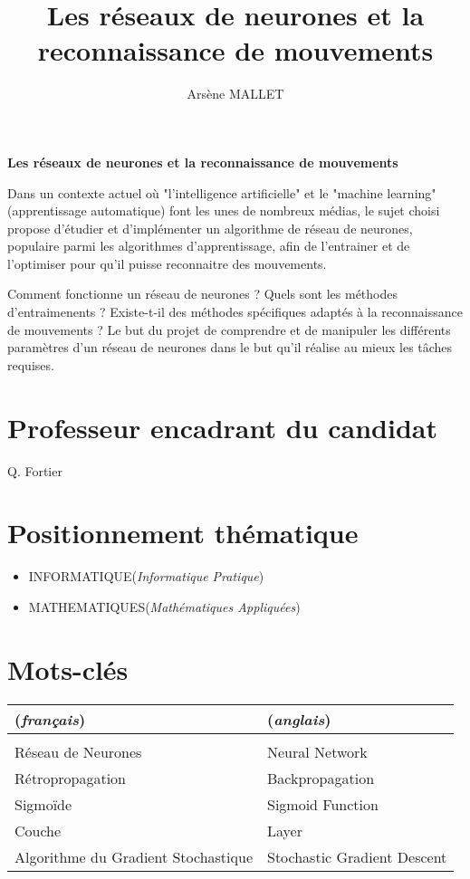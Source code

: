 \documentclass[a4paper, 11pt]{article}
\author{Arsène MALLET}
\title{Les réseaux de neurones et la reconnaissance de mouvements}
\begin{document}
    
\begin{center}
    {\textbf {\LARGE Les réseaux de neurones et la reconnaissance de mouvements}}
\end{center}

\vspace{5mm}

Dans un contexte actuel où "l'intelligence artificielle" et le "machine learning"
(apprentissage automatique) font les unes de nombreux médias, le sujet choisi
propose d'étudier et d'implémenter un algorithme de réseau de neurones, populaire
parmi les algorithmes d'apprentissage, afin de l'entrainer et de l'optimiser pour qu'il
puisse reconnaitre des mouvements.

Comment fonctionne un réseau de neurones ? Quels sont les méthodes d'entraimenents ?
Existe-t-il des méthodes spécifiques adaptés à la reconnaissance de mouvements ? 
Le but du projet de comprendre et de manipuler les différents paramètres d'un réseau
de neurones dans le but qu'il réalise au mieux les tâches requises.

\section*{Professeur encadrant du candidat}
Q. Fortier

\section*{Positionnement th\'ematique}
\begin{itemize}
    \item INFORMATIQUE(\textit{Informatique Pratique})
    \item MATHEMATIQUES(\textit{Math\'ematiques Appliqu\'ees})
\end{itemize}

\section*{Mots-cl\'es}

\begin{tabular}{l l} 
    (\textit{français}) & (\textit{anglais}) \\ \hline
     & \\
    Réseau de Neurones & Neural Network \\
    Rétropropagation & Backpropagation \\
    Sigmoïde & Sigmoid Function \\
    Couche & Layer \\
    Algorithme du Gradient Stochastique & Stochastic Gradient Descent
    \end{tabular}
\end{document}
